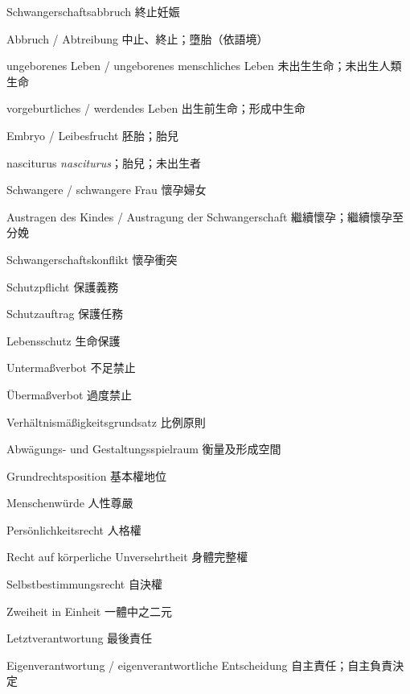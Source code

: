 \documentclass[12pt]{article}
\begin{document}
\begin{termbox}
\vspace{0.45em}
\begin{termcolumns}
\begin{termitems}
\item[Schwangerschaftsabbruch] 終止妊娠
\item[Abbruch / Abtreibung] 中止、終止；墮胎（依語境）
\item[ungeborenes Leben / ungeborenes menschliches Leben] 未出生生命；未出生人類生命
\item[vorgeburtliches / werdendes Leben] 出生前生命；形成中生命
\item[Embryo / Leibesfrucht] 胚胎；胎兒
\item[nasciturus] \textit{nasciturus}；胎兒；未出生者
\item[Schwangere / schwangere Frau] 懷孕婦女
\item[Austragen des Kindes / Austragung der Schwangerschaft] 繼續懷孕；繼續懷孕至分娩
\item[Schwangerschaftskonflikt] 懷孕衝突
\item[Schutzpflicht] 保護義務
\item[Schutzauftrag] 保護任務
\item[Lebensschutz] 生命保護
\item[Untermaßverbot] 不足禁止
\item[Übermaßverbot] 過度禁止
\item[Verhältnismäßigkeitsgrundsatz] 比例原則
\item[Abwägungs- und Gestaltungsspielraum] 衡量及形成空間
\item[Grundrechtsposition] 基本權地位
\item[Menschenwürde] 人性尊嚴
\item[Persönlichkeitsrecht] 人格權
\item[Recht auf körperliche Unversehrtheit] 身體完整權
\item[Selbstbestimmungsrecht] 自決權
\item[Zweiheit in Einheit] 一體中之二元
\item[Letztverantwortung] 最後責任
\item[Eigenverantwortung / eigenverantwortliche Entscheidung] 自主責任；自主負責決定

\end{termitems}
\end{termcolumns}
\end{termbox}
\end{document}

